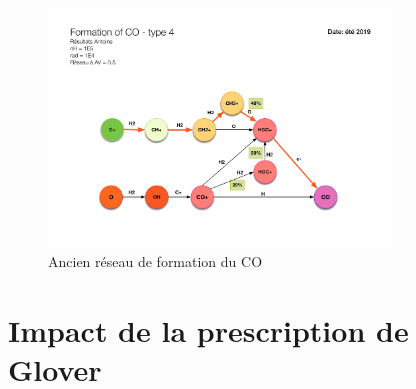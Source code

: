 \begin{appendices}
\begin{figure}[!h]
    \centering \includegraphics[trim = {3cm 3cm 3cm 7cm},clip,width=0.8\textwidth]{figure/type46/ChimieCO_1.pdf}
    \caption{Ancien réseau de formation du $\mathrm{CO}$}
    \label{fig:type46:form:COold}
\end{figure}


\clearpage
\section{Impact de la prescription de Glover}



\end{appendices}
